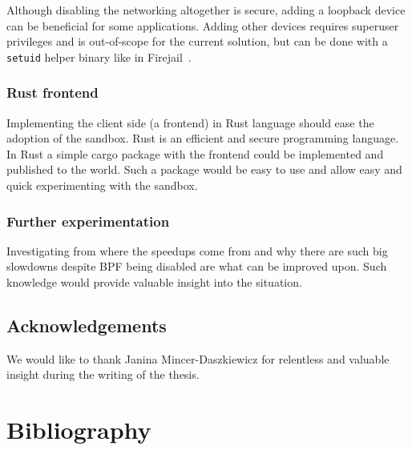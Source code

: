 \documentclass[en]{pracamgr}
\begin{document}
Although disabling the networking altogether is secure, adding a loopback device can be beneficial for some applications. Adding other devices requires superuser privileges and is out-of-scope for the current solution, but can be done with a \texttt{setuid} helper binary like in Firejail~\cite{netblue30/firejail}.

\subsection{Rust frontend}

Implementing the client side (a frontend) in Rust language should ease the adoption of the sandbox. Rust is an efficient and secure programming language. In Rust a simple cargo package with the frontend could be implemented and published to the world. Such a package would be easy to use and allow easy and quick experimenting with the sandbox.

\subsection{Further experimentation}

Investigating from where the speedups come from and why there are such big slowdowns despite BPF being disabled are what can be improved upon. Such knowledge would provide valuable insight into the situation.

\section{Acknowledgements}

We would like to thank Janina Mincer-Daszkiewicz for relentless and valuable insight during the writing of the thesis.

\chapter*{Bibliography}
\printbibliography[heading=none]
\end{document}
